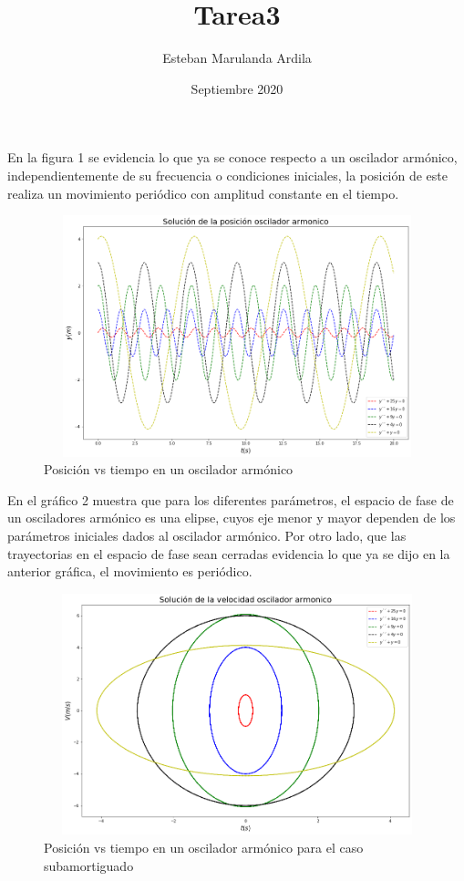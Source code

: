 \documentclass{article}
\title{Tarea3}
\author{Esteban Marulanda Ardila }
\date{Septiembre 2020}
\begin{document}
\maketitle

\section{}

En la figura 1 se evidencia lo que ya se
conoce respecto a un oscilador armónico,
independientemente de su frecuencia o
condiciones iniciales, la posición de este
realiza un movimiento periódico con amplitud
constante en el tiempo.

\begin{figure}[h!]
\centering
\includegraphics[width=12cm,height=7cm]{output_1_1.png}
\caption{Posición vs tiempo en un oscilador armónico}
\label{}
\end{figure}

\newline 
\noindent En el gráfico 2 muestra que para los diferentes parámetros, el espacio de fase de un osciladores armónico es una elipse, cuyos eje menor y mayor dependen de los parámetros iniciales dados al oscilador armónico. Por otro lado, que las trayectorias en el espacio de fase sean cerradas evidencia lo que ya se dijo en la anterior gráfica, el movimiento es periódico. 
\newline
\newline
\newline

\begin{figure}[h!]
\centering
\includegraphics[width=12cm,height=7cm]{output_3_1.png}
\caption{Posición vs tiempo en un oscilador armónico para el caso subamortiguado}
\label{fig:universe}
\end{figure}
\end{document}
